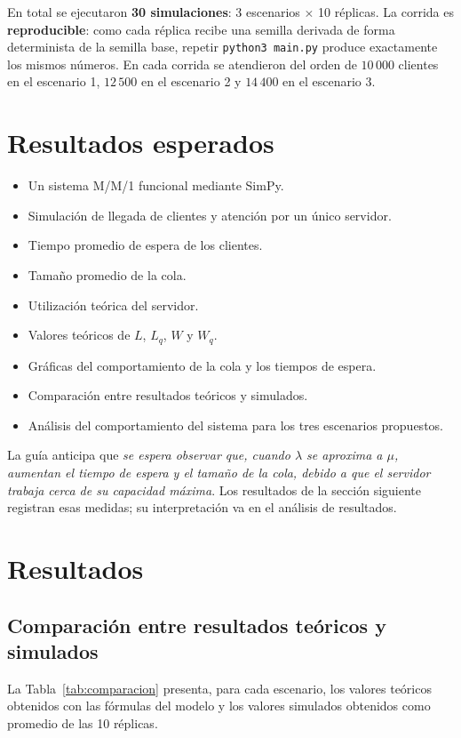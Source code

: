 \documentclass[11pt,a4paper]{article}
\begin{document}
En total se ejecutaron \textbf{30 simulaciones}: 3 escenarios $\times$ 10 réplicas. La
corrida es \textbf{reproducible}: como cada réplica recibe una semilla derivada de forma
determinista de la semilla base, repetir \texttt{python3 main.py} produce exactamente
los mismos números. En cada corrida se atendieron del orden de $10\,000$ clientes en el
escenario 1, $12\,500$ en el escenario 2 y $14\,400$ en el escenario 3.

\section{Resultados esperados}
\begin{itemize}
    \item Un sistema M/M/1 funcional mediante SimPy.
    \item Simulación de llegada de clientes y atención por un único servidor.
    \item Tiempo promedio de espera de los clientes.
    \item Tamaño promedio de la cola.
    \item Utilización teórica del servidor.
    \item Valores teóricos de $L$, $L_q$, $W$ y $W_q$.
    \item Gráficas del comportamiento de la cola y los tiempos de espera.
    \item Comparación entre resultados teóricos y simulados.
    \item Análisis del comportamiento del sistema para los tres escenarios propuestos.
\end{itemize}

\noindent La guía anticipa que \emph{se espera observar que, cuando $\lambda$ se
aproxima a $\mu$, aumentan el tiempo de espera y el tamaño de la cola, debido a que el
servidor trabaja cerca de su capacidad máxima}. Los resultados de la sección siguiente
registran esas medidas; su interpretación va en el análisis de resultados.

\section{Resultados}

\subsection{Comparación entre resultados teóricos y simulados}

La Tabla~\ref{tab:comparacion} presenta, para cada escenario, los valores teóricos
obtenidos con las fórmulas del modelo y los valores simulados obtenidos como promedio
de las 10 réplicas.
\end{document}
